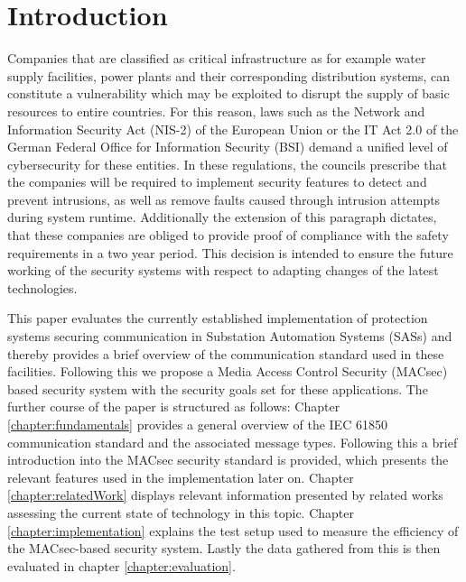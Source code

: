\documentclass[conference]{IEEEtran}
\begin{document}
\section{Introduction}
\label{chapter:introduction}
\noindent Companies that are classified as critical infrastructure as for example water supply facilities, power plants and their corresponding 
distribution systems, can constitute a vulnerability which may be exploited to disrupt the supply of basic resources to entire countries. For this reason, 
laws such as the Network and Information Security Act (NIS-2) \cite{NIS-2:2022} of the European Union or the IT Act 2.0 \cite{IT-Gesetz_2:2021} of the 
German Federal Office for Information Security (BSI) demand a unified level of cybersecurity for these entities. In these regulations, the councils 
prescribe that the companies will be required to implement security features to detect and prevent intrusions, as well as remove faults caused through 
intrusion attempts during system runtime. \cite[§11 (1d)]{IT-Gesetz_2:2021} Additionally the extension of this paragraph dictates, that these companies 
are obliged to provide proof of compliance with the safety requirements in a two year period. \cite[§11 (1e)]{IT-Gesetz_2:2021} This decision is intended 
to ensure the future working of the security systems with respect to adapting changes of the latest technologies. 

\smallskip
This paper evaluates the currently established implementation of protection systems securing communication in Substation Automation Systems (SASs) and 
thereby provides a brief overview of the communication standard used in these facilities. Following this we propose a Media Access Control Security 
(MACsec) based security system with the security goals set for these applications. The further course of the paper is structured as follows: 
Chapter \ref{chapter:fundamentals} provides a general overview of the IEC 61850 communication standard and the associated  message types. Following this a 
brief introduction into the MACsec security standard is provided, which presents the relevant features used in the implementation later on. Chapter 
\ref{chapter:relatedWork} displays relevant information presented by related works assessing the current state of technology in this topic. Chapter 
\ref{chapter:implementation} explains the test setup used to measure the efficiency of the MACsec-based security system. Lastly the data gathered from 
this is then evaluated in chapter \ref{chapter:evaluation}. 

\end{document}
